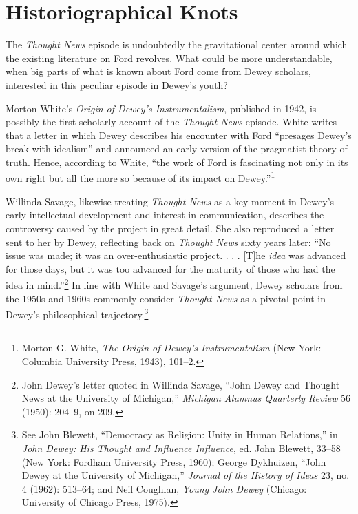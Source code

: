 \documentclass[twoside,symmetric,nobib,justified]{tufte-book}
\begin{document}
\hypertarget{historiographical-knots}{%
\section{Historiographical Knots}\label{historiographical-knots}}

The \emph{Thought News} episode is undoubtedly the gravitational center
around which the existing literature on Ford revolves. What could be
more understandable, when big parts of what is known about Ford come
from Dewey scholars, interested in this peculiar episode in Dewey's
youth?

\newpage Morton White's \emph{Origin of Dewey's Instrumentalism}, published in
1942, is possibly the first scholarly account of the \emph{Thought News}
episode. White writes that a letter in which Dewey describes his
encounter with Ford ``presages Dewey's break with idealism'' and
announced an early version of the pragmatist theory of truth. Hence,
according to White, ``the work of Ford is fascinating not only in its
own right but all the more so because of its impact on
Dewey.''\footnote{Morton G. White, \emph{The Origin of Dewey's
  Instrumentalism} (New York: Columbia University Press, 1943), 101--2.}

Willinda Savage, likewise treating \emph{Thought News} as a key moment
in Dewey's early intellectual development and interest in communication,
describes the controversy caused by the project in great detail. She
also reproduced a letter sent to her by Dewey, reflecting back on
\emph{Thought News} sixty years later: ``No issue was made; it was an
over-enthusiastic project. . . . {[}T{]}he \emph{idea} was advanced for
those days, but it was too advanced for the maturity of those who had
the idea in mind.''\footnote{John Dewey's letter quoted in Willinda
  Savage, ``John Dewey and Thought News at the University of Michigan,''
  \emph{Michigan Alumnus Quarterly Review} 56 (1950): 204--9, on 209.}
In line with White and Savage's argument, Dewey scholars from the 1950s
and 1960s commonly consider \emph{Thought News} as a pivotal point in
Dewey's philosophical trajectory.\footnote{See John Blewett, ``Democracy
  as Religion: Unity in Human Relations,'' in \emph{John Dewey: His
  Thought and Influence Influence}, ed. John Blewett, 33--58 (New York:
  Fordham University Press, 1960); George Dykhuizen, ``John Dewey at the
  University of Michigan,'' \emph{Journal of the History of Ideas} 23,
  no. 4 (1962): 513­--64; and Neil Coughlan, \emph{Young John Dewey}
  (Chicago: University of Chicago Press, 1975).}
\end{document}
